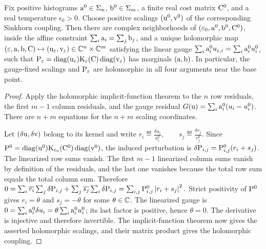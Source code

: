 \begin{thm}\label{thm-carlier-complex-sinkhorn}
Fix positive histograms $\a^0\in\simplex_n$, $\b^0\in\simplex_m$, a finite real cost matrix $\C^0$, and a real temperature $\epsilon_0>0$. Choose positive scalings $(\uD^0,\vD^0)$ of the corresponding Sinkhorn coupling. Then there are complex neighborhoods of $(\epsilon_0,\a^0,\b^0,\C^0)$, inside the affine constraint $\sum_i \a_i=\sum_j \b_j$, and a unique holomorphic map
\((\epsilon,\a,\b,\C)\mapsto(\uD_\epsilon,\vD_\epsilon)\in\CC^n\times\CC^m\)
satisfying the linear gauge $\sum_i\a_i^0u_{\epsilon,i}=\sum_i\a_i^0u_i^0$, such that
$\P_\epsilon=\diag(\uD_\epsilon)\K_\epsilon(\C)\diag(\vD_\epsilon)$ has marginals $(\a,\b)$. In particular, the gauge-fixed scalings and $\P_\epsilon$ are holomorphic in all four arguments near the base point.
\end{thm}
\begin{proof}
Apply the holomorphic implicit-function theorem to the $n$ row residuals, the first $m-1$ column residuals, and the gauge residual $G(\uD)=\sum_i\a_i^0(u_i-u_i^0)$. There are $n+m$ equations for the $n+m$ scaling coordinates.

Let $(\delta\uD,\delta\vD)$ belong to its kernel and write
\(r_i\eqdef\frac{\delta u_i}{u_i^0}, \qquad s_j\eqdef\frac{\delta v_j}{v_j^0}.\)
Since $\P^0=\diag(\uD^0)\K_{\epsilon_0}(\C^0)\diag(\vD^0)$, the induced perturbation is $\delta\P_{i,j}=\P^0_{i,j}(r_i+s_j)$.
The linearized row sums vanish. The first $m-1$ linearized column sums vanish by definition of the residuals, and the last one vanishes because the total row sum equals the total column sum. Therefore
\(0 = \sum_i \overline{r_i}\sum_j\delta \P_{i,j} + \sum_j \overline{s_j}\sum_i\delta \P_{i,j} = \sum_{i,j}\P^0_{i,j}\abs{r_i+s_j}^2.\)
Strict positivity of $\P^0$ gives $r_i=\theta$ and $s_j=-\theta$ for some $\theta\in\CC$. The linearized gauge is $0=\sum_i\a_i^0\delta u_i=\theta\sum_i\a_i^0u_i^0$; its last factor is positive, hence $\theta=0$. The derivative is injective and therefore invertible. The implicit-function theorem now gives the asserted holomorphic scalings, and their matrix product gives the holomorphic coupling.
\end{proof}
